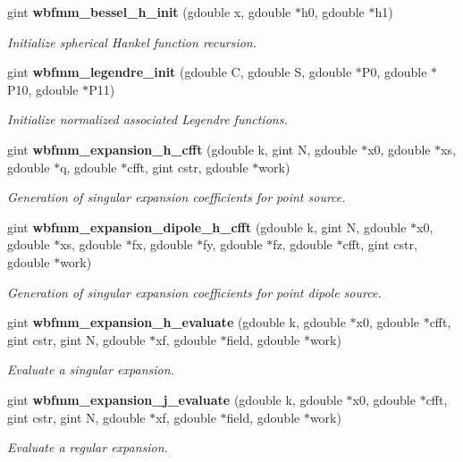 \begin{DoxyCompactItemize}
gint {\bf wbfmm\+\_\+bessel\+\_\+h\+\_\+init} (gdouble x, gdouble $\ast$h0, gdouble $\ast$h1)
\begin{DoxyCompactList}\small\item\em Initialize spherical Hankel function recursion. \end{DoxyCompactList}\item 
gint {\bf wbfmm\+\_\+legendre\+\_\+init} (gdouble C, gdouble S, gdouble $\ast$P0, gdouble $\ast$P10, gdouble $\ast$P11)
\begin{DoxyCompactList}\small\item\em Initialize normalized associated Legendre functions. \end{DoxyCompactList}\item 
gint {\bf wbfmm\+\_\+expansion\+\_\+h\+\_\+cfft} (gdouble k, gint N, gdouble $\ast$x0, gdouble $\ast$xs, gdouble $\ast$q, gdouble $\ast$cfft, gint cstr, gdouble $\ast$work)
\begin{DoxyCompactList}\small\item\em Generation of singular expansion coefficients for point source. \end{DoxyCompactList}\item 
gint {\bf wbfmm\+\_\+expansion\+\_\+dipole\+\_\+h\+\_\+cfft} (gdouble k, gint N, gdouble $\ast$x0, gdouble $\ast$xs, gdouble $\ast$fx, gdouble $\ast$fy, gdouble $\ast$fz, gdouble $\ast$cfft, gint cstr, gdouble $\ast$work)
\begin{DoxyCompactList}\small\item\em Generation of singular expansion coefficients for point dipole source. \end{DoxyCompactList}\item 
gint {\bf wbfmm\+\_\+expansion\+\_\+h\+\_\+evaluate} (gdouble k, gdouble $\ast$x0, gdouble $\ast$cfft, gint cstr, gint N, gdouble $\ast$xf, gdouble $\ast$field, gdouble $\ast$work)
\begin{DoxyCompactList}\small\item\em Evaluate a singular expansion. \end{DoxyCompactList}\item 
gint {\bf wbfmm\+\_\+expansion\+\_\+j\+\_\+evaluate} (gdouble k, gdouble $\ast$x0, gdouble $\ast$cfft, gint cstr, gint N, gdouble $\ast$xf, gdouble $\ast$field, gdouble $\ast$work)
\begin{DoxyCompactList}\small\item\em Evaluate a regular expansion. \end{DoxyCompactList}\item 

\end{DoxyCompactItemize}

